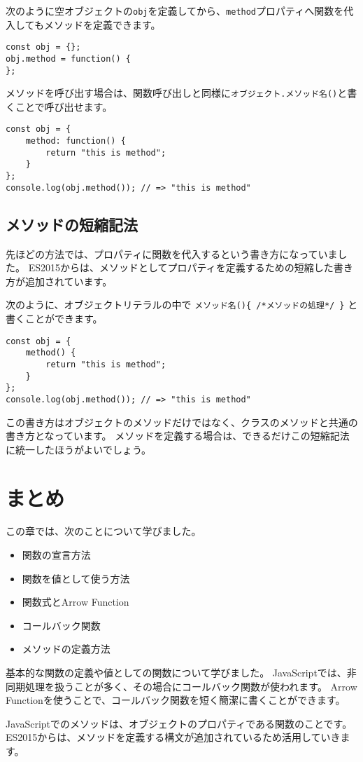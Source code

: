 次のように空オブジェクトの\texttt{obj}を定義してから、\texttt{method}プロパティへ関数を代入してもメソッドを定義できます。

\begin{lstlisting}
const obj = {};
obj.method = function() {
};
\end{lstlisting}

メソッドを呼び出す場合は、関数呼び出しと同様に\texttt{オブジェクト.\hbox{}メソッド名()}と書くことで呼び出せます。

\begin{lstlisting}
const obj = {
    method: function() {
        return "this is method";
    }
};
console.log(obj.method()); // => "this is method"
\end{lstlisting}

\hypertarget{shorthand-for-method}{%
\subsection[メソッドの短縮記法]{メソッドの短縮記法\,\protect{}}\label{shorthand-for-method}}

先ほどの方法では、プロパティに関数を代入するという書き方になっていました。
ES2015からは、メソッドとしてプロパティを定義するための短縮した書き方が追加されています。

次のように、オブジェクトリテラルの中で
\texttt{メソッド名()\{ /*メソッドの処理*/ \}}
と書くことができます。

\begin{lstlisting}
const obj = {
    method() {
        return "this is method";
    }
};
console.log(obj.method()); // => "this is method"
\end{lstlisting}

\enlargethispage{\baselineskip}この書き方はオブジェクトのメソッドだけではなく、クラスのメソッドと共通の書き方となっています。
メソッドを定義する場合は、できるだけこの短縮記法に統一したほうがよいでしょう。

\hypertarget{function-declaration-summary}{%
\section{まとめ}\label{function-declaration-summary}}

この章では、次のことについて学びました。

\begin{itemize}
\item
  関数の宣言方法
\item
  関数を値として使う方法
\item
  関数式とArrow Function
\item
  コールバック関数
\item
  メソッドの定義方法
\end{itemize}

基本的な関数の定義や値としての関数について学びました。
JavaScriptでは、非同期処理を扱うことが多く、その場合にコールバック関数が使われます。
Arrow
Functionを使うことで、コールバック関数を短く簡潔に書くことができます。

JavaScriptでのメソッドは、オブジェクトのプロパティである関数のことです。
ES2015からは、メソッドを定義する構文が追加されているため活用していきます。
